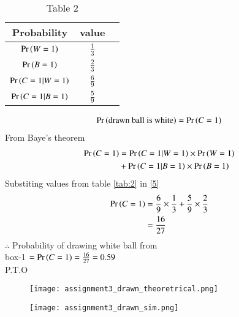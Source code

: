 \documentclass[journal,12pt,twocolumn]{IEEEtran}
\begin{document}
\begin{table}[h!]
\resizebox{7.5cm}{!}
{ 
\begin{tabular}{|c|c|c|}
\hline
Probability &  value\\
\hline
$\Pr\left(W=1\right)$ & $\frac{1}{3}$ \\
\hline
$\Pr\left(B=1\right)$ &   $\frac{2}{3}$ \\
\hline
$\Pr\left(C=1|W=1\right)$ & $\frac{6}{9}$ \\
\hline
 $\Pr\left(C=1|B=1\right)$ &   $\frac{5}{9}$ \\
\hline
\end{tabular}
}
\caption{Table 2} 
\label{tab:2}
\end{table}

\begin{align}
\Pr\left(\text{drawn ball is white}\right)&= \Pr\left(C=1\right)\\
\end{align}
 From Baye's theorem
\begin{align}
\Pr\left(C=1\right)&=\Pr\left(C=1|W=1\right) \times \Pr\left(W=1\right) \notag \\
 & +\Pr\left(C=1|B=1\right) \times \Pr\left(B=1\right)  \label{5}
\end{align}
Substiting values from table \eqref{tab:2} in \eqref{5}
\begin{align}
\Pr\left(C=1\right) &= \frac{6}{9} \times \frac{1}{3}  + \frac{5}{9} \times \frac{2}{3} \\
&=\frac{16}{27} \label{6}
\end{align}
$\therefore$ Probability of drawing white ball from\\
 box-1 $=\Pr\left(C=1\right)=\frac{16}{27}=0.59$ \\
 P.T.O \\
\begin{figure}[htb!]
\begin{center}
\texttt{[image: assignment3\_drawn\_theoretrical.png]}
\end{center}
\end{figure}

\begin{figure}[htb!]
\begin{center}
\texttt{[image: assignment3\_drawn\_sim.png]}
\end{center}
\end{figure}
\end{document}
